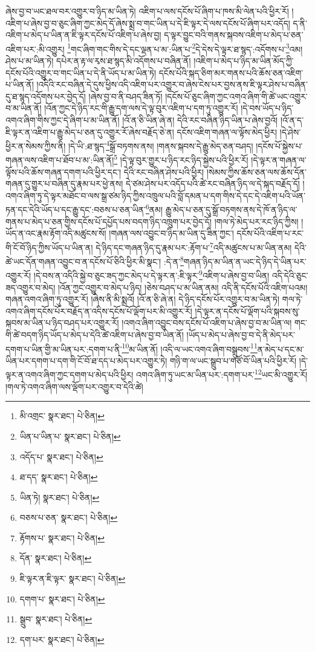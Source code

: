 ཞེས་བྱ་བ་ཡང་ཐལ་བར་འགྱུར་བ་ཉིད་མ་ཡིན་ཏེ། འཇིག་པ་ལས་དངོས་པོ་ཞིག་པ་ཁས་མི་ལེན་པའི་ཕྱིར་རོ། །འཇིག་པ་ཞེས་བྱ་བ་ཅུང་ཞིག་ཀྱང་མེད་དོ་ཞེས་སྨྲ་བ་གང་ཡིན་པ་དེ་ཇི་ལྟར་དེ་ལས་དངོས་པོ་ཞིག་པར་འདོད། ད་ནི་འཇིག་པ་མེད་པ་ཡིན་ན་ཇི་ལྟར་དངོས་པོ་འཇིག་པ་ཞེས་བྱ། ད་ལྟར་བྱུང་བའི་གནས་སྐབས་འཇིག་པ་མེད་པ་ཅན་འཇིག་པར་:མི་འགྱུར། \footnote{མི་འགྲང་  སྣར་ཐང་།  པེ་ཅིན། }གང་ཞིག་གང་གིས་དེ་དང་ལྡན་པ་མ་:ཡིན་པ་\footnote{ཡིན་པ་ཡིན་པ་  སྣར་ཐང་།  པེ་ཅིན། }དེ་དེས་དེ་ལྟར་ཐ་སྙད་:འདོགས་པ་\footnote{འདོད་པ་  སྣར་ཐང་།  པེ་ཅིན། }འམ། ཤེས་པ་མ་ཡིན་ཏེ། དཔེར་ན་རྟ་ལ་རྭས་ཐ་སྙད་མི་འདོགས་པ་བཞིན་ནོ། །འཇིག་པ་མེད་པ་ཉིད་མ་ཡིན་མོད་ཀྱི་དངོས་པོའི་འགྱུར་བ་གང་ཡིན་པ་དེ་ནི་ཡོད་པ་མ་ཡིན་ཏེ། དངོས་པོའི་སྐད་ཅིག་མར་གནས་པའི་ཆོས་ཅན་འཇིག་པ་ཡིན་ནོ། །འདིའི་རང་བཞིན་དེ་དུས་ཕྱིས་འདི་འཇིག་པར་འགྱུར་བ་ཞེས་ངེས་པར་བྱས་ནས་ཇི་ལྟར་ཤེས་པ་བཞིན་དུ་ཐ་སྙད་འདོགས་པར་བྱེད་དོ། །ཞེས་བྱ་བ་ནི་བཤད་ཟིན་ཏོ། །དངོས་པོ་ཅུང་ཞིག་ཀྱང་འགའ་ཞིག་གི་ཚེ་ཡང་འགྱུར་བ་མ་ཡིན་ནོ། །འོན་ཀྱང་དེ་ཉིད་རང་གི་རྒྱུ་དག་ལས་དེ་ལྟ་བུར་འཇིག་པ་དག་ཏུ་འགྱུར་རོ། །དེ་བས་ཡོད་པ་ཉིད་འགའ་ཞིག་གིས་ཀྱང་དེ་ཞིག་པ་མ་ཡིན་ནོ། །འོ་ན་ཅི་ཡིན་ཞེ་ན། དེའི་རང་བཞིན་ཉིད་ཡིན་པ་ཞེས་བྱའོ། །འོ་ན་ད་ཇི་ལྟར་ན་འཇིག་པ་རྒྱུ་མེད་པ་ཅན་དུ་འགྱུར་རོ་ཞེས་བརྗོད་ཅེ་ན། དངོས་འཇིག་གཞན་ལ་ལྟོས་མེད་ཕྱིར། །དེ་ཤེས་ཕྱིར་ན་སེམས་ཀྱིས་ནི། །དེ་ཡི་:ཐ་སྙད་\footnote{ཐ་དད་  སྣར་ཐང་།  པེ་ཅིན། }སྒྲོ་བཏགས་ནས། །གནས་སྐབས་དེ་རྒྱུ་མེད་ཅན་བཤད། །དངོས་པོ་སྐྱེས་པ་གཞན་ལས་འཇིག་པ་ཐོབ་པ་མ་:ཡིན་ནོ།\footnote{ཡིན་ཏེ།  སྣར་ཐང་།  པེ་ཅིན། } །དེ་ལྟ་བུར་གྱུར་པ་ཉིད་རང་ཉིད་སྐྱེས་པའི་ཕྱིར་རོ། །དེ་ལྟར་ན་གཞན་ལ་ལྟོས་པའི་ཆོས་གཞན་དགག་པའི་ཕྱིར་དང་། དེའི་རང་བཞིན་ཤེས་པའི་ཕྱིར། །སེམས་ཀྱིས་ཆོས་ཅན་ལས་ཆོས་དོན་གཞན་དུ་གྱུར་པ་བཞིན་དུ་རྣམ་པར་ཕྱེ་ནས། དེ་ཙམ་ཤེས་པར་འདོད་པའི་ཚེ་རང་བཞིན་ཉིད་ལ་དེ་སྐད་བརྗོད་དོ། །འགའ་ཞིག་ཏུ་དེ་ལྟར་མཐོང་བ་ལས་སྒྲ་ཙམ་ཉིད་ཀྱིས་འཁྲུལ་པའི་བློ་དམན་པ་དག་གིས་དེ་དང་དེ་འཇིག་པའི་ཡོན་ཏན་དང་དེའི་ཡོད་པ་དང་རྒྱུ་དང་:བཅས་པ་ཅན་ཡིན་\footnote{བཅས་པ་ཅན་  སྣར་ཐང་།  པེ་ཅིན། }ནམ། རྒྱུ་མེད་པ་ཅན་དུ་སྒྲོ་བཏགས་ནས་དེ་ཁོ་ན་ཉིད་ལ་གནས་པ་མེད་པ་ཅན་གྱིས་དངོས་པོ་དཔྱོད་པས་བདག་ཉིད་འཁྲུག་པར་བྱེད་དོ། །གལ་ཏེ་མེད་པར་རང་ཉིད་ཀྱིས། །ཡོད་ན་འང་རྣམ་རྟོག་འདི་མཚུངས་སོ། །གཞན་ལས་འབྱུང་བ་ཉིད་མ་ཡིན་དུ་ཟིན་ཀྱང་། དངོས་པོའི་འཇིག་པ་རང་གི་ངོ་བོ་ཉིད་ཀྱིས་ཡོད་པ་ཡིན་ན། དེ་ཉིད་དང་གཞན་ཉིད་དུ་རྣམ་པར་:རྟོག་པ་\footnote{རྟོགས་པ་  སྣར་ཐང་།  པེ་ཅིན། }འདི་མཚུངས་པ་མ་ཡིན་ནམ། དེའི་ཚེ་ཡང་དོན་གཞན་འབྱུང་བ་ན་དངོས་པོ་ཅིའི་ཕྱིར་མི་སྣང་། :དེ་ན་\footnote{དོན་  སྣར་ཐང་།  པེ་ཅིན། }གཞན་ཉིད་མ་ཡིན་ན་ཡང་དེ་ཉིད་དེ་ཡིན་པར་འགྱུར་རོ། །དེ་བས་ན་འདིའི་སྐྱེ་བ་ཅུང་ཟད་ཀྱང་མེད་པ་དེ་ལྟར་ན་:ཇི་ལྟར་\footnote{ཇི་ལྟར་ན་ཇི་ལྟར་  སྣར་ཐང་།  པེ་ཅིན། }འཇིག་པ་ཞེས་བྱ་བ་ཡིན། འདི་དེའི་ཅུང་ཟད་འགྱུར་བ་མེད། །འོན་ཀྱང་འགྱུར་བ་མེད་པ་ཉིད། །ཅེས་བཤད་པ་མ་ཡིན་ནམ། འདི་ནི་དངོས་པོའི་འཇིག་པའམ། གཞན་འགའ་ཞིག་ཏུ་འགྱུར་རོ། །ཞེས་ནི་མི་སྨྲའོ། །འོ་ན་ཅི་ཞེ་ན། དེ་ཉིད་དངོས་པོར་འགྱུར་བ་མ་ཡིན་ཏེ། གལ་ཏེ་འགའ་ཞིག་དངོས་པོར་བརྗོད་ན་འདིས་དངོས་པོ་ལྡོག་པར་མི་འགྱུར་རོ། །དེ་ལྟར་ན་དངོས་པོ་ལྡོག་པའི་སྐབས་སུ་སྐབས་མ་ཡིན་པ་ཉིད་བཤད་པར་འགྱུར་རོ། །འགའ་ཞིག་འབྱུང་བས་དངོས་པོ་འཇིག་པ་ཞེས་བྱ་བ་མ་ཡིན་ལ། གང་གི་ཚེ་བདག་ཉིད་ཡོད་པ་མེད་པ་དེའི་ཚེ་འཇིག་པ་ཞེས་བྱ་བ་ཡིན་ནོ། །ཡོད་པ་མེད་པ་ཞེས་བྱ་བ་དེ་ནི་མེད་པར་དགག་པ་ཡིན་གྱི་མ་ཡིན་པར་:དགག་པ་ནི་\footnote{དགག་པ་  སྣར་ཐང་།  པེ་ཅིན། }མ་ཡིན་ནོ། །འདི་ལ་ཡང་འགའ་ཞིག་བསྒྲུབས་\footnote{སྒྲུབ་  སྣར་ཐང་།  པེ་ཅིན། }ན་མེད་པ་དང་མ་ཡིན་པར་དགག་པ་དག་གི་ངོ་བོ་ཐ་དད་པ་མེད་པར་འགྱུར་ཏེ། གཉི་ག་ལ་ཡང་སྒྲུབ་པ་གཙོ་བོ་ཡིན་པའི་ཕྱིར་རོ། །དེ་ལྟར་ན་འགའ་ཞིག་ཀྱང་དགག་པ་མེད་པའི་ཕྱིར། འགའ་ཞིག་ཏུ་ཡང་མ་ཡིན་པར་:དགག་པར་\footnote{དག་པར་  སྣར་ཐང་།  པེ་ཅིན། }ཡང་མི་འགྱུར་རོ། །གལ་ཏེ་འགའ་ཞིག་ལས་ལྡོག་པར་འགྱུར་བ་དེའི་ཚེ། 